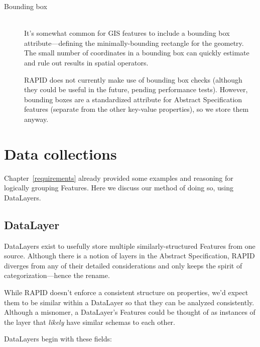 \begin{description}
\item[Bounding box] \hfill \\
  It's somewhat common for GIS features to include a bounding box attribute---defining the minimally-bounding rectangle for the geometry. The small number of coordinates in a bounding box can quickly estimate and rule out results in spatial operators.

  RAPID does not currently make use of bounding box checks (although they could be useful in the future, pending performance tests). However, bounding boxes are a standardized attribute for Abstract Specification features (separate from the other key-value properties), so we store them anyway.
  
\end{description}

\section{Data collections}
Chapter~\ref{requirements} already provided some examples and reasoning for logically grouping Features. Here we discuss our method of doing so, using DataLayers.

\subsection{DataLayer}
DataLayers exist to usefully store multiple similarly-structured Features from one source. Although there is a notion of layers in the Abstract Specification, RAPID diverges from any of their detailed considerations and only keeps the spirit of categorization---hence the rename.

While RAPID doesn't enforce a consistent structure on properties, we'd expect them to be similar within a DataLayer so that they can be analyzed consistently. Although a misnomer, a DataLayer's Features could be thought of as instances of the layer that \textit{likely} have similar schemas to each other.

DataLayers begin with these fields:

